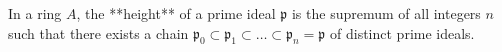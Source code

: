 In a ring $A$, the **height** of a prime ideal $\mathfrak{p}$ is the supremum of all integers $n$ such that there exists a chain $\mathfrak{p}_0 \subset \mathfrak{p}_1 \subset \ldots \subset \mathfrak{p}_n = \mathfrak{p}$ of distinct prime ideals.
